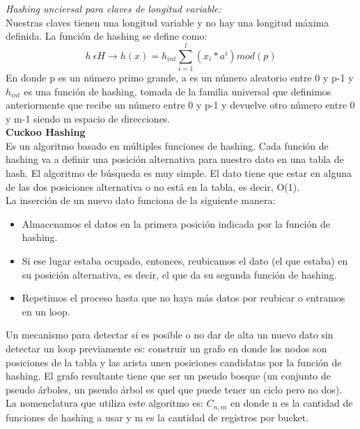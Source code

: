 \documentclass[titlepage,a4paper]{article}
\begin{document}
 
\textit{Hashing unciersal para claves de longitud variable:}\\
Nuestras claves tienen una longitud variable y no hay una longitud máxima definida. La función de hashing se define como: $$ h \ \epsilon H \rightarrow h(x) = h_{int} \sum_{i=1}^l(x_i*a^i) mod(p)$$
En donde p es un número primo grande, a es un número aleatorio entre 0 y p-1 y $h_{int}$ es una función de hashing, tomada de la familia universal que definimos anteriormente que recibe un número entre 0 y p-1 y devuelve otro número entre 0 y m-1 siendo m espacio de direcciones. \\

\textbf{Cuckoo Hashing}\\

Es un algoritmo basado en múltiples funciones de hashing. Cada función de hashing va a definir una posición alternativa para nuestro dato en una tabla de hash. El algoritmo de búsqueda es muy simple. El dato tiene que estar en alguna de las dos posiciones alternativa o no está en la tabla, es decir, O(1). \\

La inserción de un nuevo dato funciona de la siguiente manera: \\
\begin{itemize}
\item Almacenamos el datos en la  primera posición indicada por la función de hashing. 
\item Si ese lugar estaba ocupado, entonces, reubicamos el dato (el que estaba) en su posición alternativa, es decir, el que da su segunda función de hashing. \\
\item Repetimos el proceso hasta que no haya más datos por reubicar o entramos en un loop. 
\end{itemize}

Un mecanismo para detectar si es posible o no dar de alta un nuevo dato sin detectar un loop previamente es: construir un grafo en donde los nodos son posiciones de la tabla y las arista unen posiciones candidatas por la función de hashing. El grafo resultante tiene que ser un pseudo bosque (un conjunto de pseudo árboles, un pseudo árbol es quel que puede tener un ciclo pero no dos). \\

La nomenclatura que utiliza este algoritmo es: $C_{n,m}$ en donde n es la cantidad de funciones de hashing a usar y m es la cantidad de registros por bucket. \\
\end{document}
